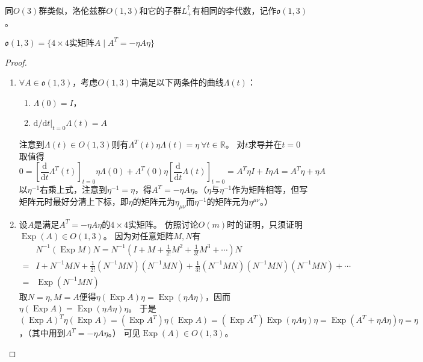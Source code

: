 同$O(3)$群类似，洛伦兹群$O(1, 3)$和它的子群$L^\uparrow_+$有相同的李代数，记作$\mathfrak{o}(1, 3)$。

\begin{theorem}
    $\mathfrak{o}(1, 3) = \{4 \times 4 \text{实矩阵} A \mid A^T = -\eta A \eta\}$
\end{theorem}

\begin{proof}
    \begin{enumerate}[（A）]
        \item $\forall A \in \mathfrak{o}(1, 3)$，考虑$O(1, 3)$中满足以下两条件的曲线$\Lambda(t)$：
        \begin{enumerate}[（1）]
            \item $\Lambda(0) = I$，
            \item $\mathrm{d} / \mathrm{d}t|_{t = 0}\Lambda(t) = A$
        \end{enumerate}
        注意到$\Lambda(t) \in O(1, 3)$则有$\Lambda^T(t)\eta\Lambda(t) = \eta ~ \forall t \in \mathbb{R}$。
        对$t$求导并在$t = 0$取值得
        $$0 = \left[\frac{\mathrm{d}}{\mathrm{d}t}\Lambda^T(t)\right]_{t = 0}\eta\Lambda(0) + \Lambda^T(0)\eta\left[\frac{\mathrm{d}}{\mathrm{d}t}\Lambda(t)\right]_{t = 0} = A^T \eta I + I \eta A = A^T \eta + \eta A$$
        以$\eta^{-1}$右乘上式，注意到$\eta^{-1} = \eta$，得$A^T = -\eta A \eta$。（$\eta$与$\eta^{-1}$作为矩阵相等，但写矩阵元时最好分清上下标，即$\eta$的矩阵元为$\eta_{\mu\nu}$而$\eta^{-1}$的矩阵元为$\eta^{\mu\nu}$。）
        \item 设$A$是满足$A^T = -\eta A \eta$的$4 \times 4$实矩阵。
        仿照讨论$O(m)$时的证明，只须证明$\operatorname{Exp}(A) \in O(1, 3)$。
        因为对任意矩阵$M, N$有
        $$\begin{aligned}
            & N^{-1}(\operatorname{Exp}M)N = N^{-1}(I + M + \frac{1}{2!}M^2 + \frac{1}{3!}M^3 + \cdots)N \\
            = & I + N^{-1}MN + \frac{1}{2!}(N^{-1}MN)(N^{-1}MN) + \frac{1}{3!}(N^{-1}MN)(N^{-1}MN)(N^{-1}MN) + \cdots \\
            = & \operatorname{Exp}(N^{-1}MN)
        \end{aligned}$$
        取$N = \eta, M = A$便得$\eta(\operatorname{Exp}A)\eta = \operatorname{Exp}(\eta A \eta)$，因而$\eta(\operatorname{Exp}A) = \operatorname{Exp}(\eta A \eta)\eta$。
        于是$(\operatorname{Exp}A)^T\eta(\operatorname{Exp}A) = (\operatorname{Exp}A^T)\eta(\operatorname{Exp}A) = (\operatorname{Exp}A^T)\operatorname{Exp}(\eta A \eta)\eta = \operatorname{Exp}(A^T + \eta A \eta)\eta = \eta$，（其中用到$A^T = -\eta A \eta$。）
        可见$\operatorname{Exp}(A) \in O(1, 3)$。
    \end{enumerate}
\end{proof}

